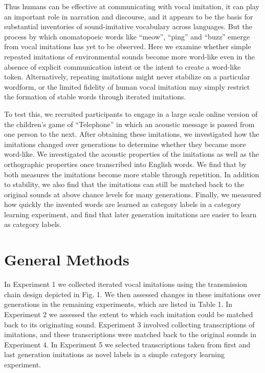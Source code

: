 \documentclass[10pt,letterpaper]{article}
\begin{document}
Thus humans can be effective at communicating with vocal imitation, it
can play an important role in narration and discourse, and it appears to
be the basis for substantial inventories of sound-imitative vocabulary
across languages. But the process by which onomatopoeic words like
``meow'', ``ping'' and ``buzz'' emerge from vocal imitations has yet to
be observed. Here we examine whether simple repeated imitations of
environmental sounds become more word-like even in the absence of
explicit communication intent or the intent to create a word-like token.
Alternatively, repeating imitations might never stabilize on a
particular wordform, or the limited fidelity of human vocal imitation
may simply restrict the formation of stable words through iterated
imitations.

To test this, we recruited participants to engage in a large scale
online version of the children's game of ``Telephone'' in which an
acoustic message is passed from one person to the next. After obtaining
these imitations, we investigated how the imitations changed over
generations to determine whether they became more word-like. We
investigated the acoustic properties of the imitations as well as the
orthographic properties once transcribed into English words. We find
that by both measures the imitations become more stable through
repetition. In addition to stability, we also find that the imitations
can still be matched back to the original sounds at above chance levels
for many generations. Finally, we measured how quickly the invented
words are learned as category labels in a category learning experiment,
and find that later generation imitations are easier to learn as
category labels.

\section{General Methods}\label{general-methods}

In Experiment 1 we collected iterated vocal imitations using the
transmission chain design depicted in Fig. 1. We then assessed changes
in these imitations over generations in the remaining experiments, which
are listed in Table 1. In Experiment 2 we assessed the extent to which
each imitation could be matched back to its originating sound.
Experiment 3 involved collecting transcriptions of imitations, and these
transcriptions were matched back to the original sounds in Experiment 4.
In Experiment 5 we selected transcriptions taken from first and last
generation imitations as novel labels in a simple category learning
experiment.
\end{document}
